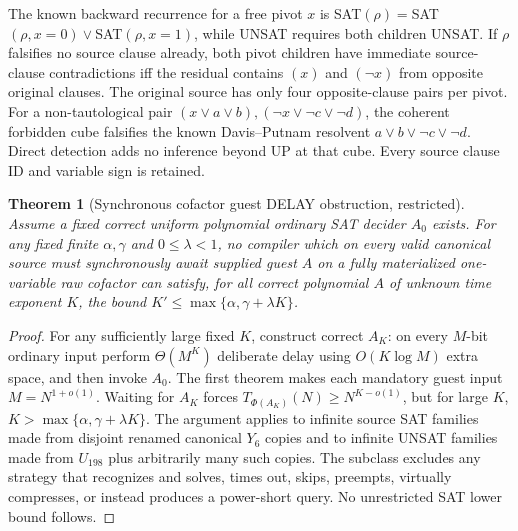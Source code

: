 \documentclass[10pt]{article}
\newtheorem{theorem}{Theorem}
\begin{document}
The known backward recurrence for a free pivot $x$ is SAT$(\rho)=$SAT$(\rho,x=0)\vee$SAT$(\rho,x=1)$, while UNSAT requires both children UNSAT. If $\rho$ falsifies no source clause already, both pivot children have immediate source-clause contradictions iff the residual contains $(x)$ and $(\neg x)$ from opposite original clauses. The original source has only four opposite-clause pairs per pivot. For a non-tautological pair $(x\vee a\vee b),(\neg x\vee\neg c\vee\neg d)$, the coherent forbidden cube falsifies the known Davis--Putnam resolvent $a\vee b\vee\neg c\vee\neg d$. Direct detection adds no inference beyond UP at that cube. Every source clause ID and variable sign is retained.
\begin{theorem}[Synchronous cofactor guest DELAY obstruction, restricted]
Assume a fixed correct uniform polynomial ordinary SAT decider $A_0$ exists. For any fixed finite $\alpha,\gamma$ and $0\le\lambda<1$, no compiler which on every valid canonical source must synchronously await supplied guest $A$ on a fully materialized one-variable raw cofactor can satisfy, for all correct polynomial $A$ of unknown time exponent $K$, the bound $K'\le\max\{\alpha,\gamma+\lambda K\}$.
\end{theorem}
\begin{proof}
For any sufficiently large fixed $K$, construct correct $A_K$: on every $M$-bit ordinary input perform $\Theta(M^K)$ deliberate delay using $O(K\log M)$ extra space, and then invoke $A_0$. The first theorem makes each mandatory guest input $M=N^{1+o(1)}$. Waiting for $A_K$ forces $T_{\Phi(A_K)}(N)\ge N^{K-o(1)}$, but for large $K$, $K>\max\{\alpha,\gamma+\lambda K\}$. The argument applies to infinite source SAT families made from disjoint renamed canonical $Y_6$ copies and to infinite UNSAT families made from $U_{198}$ plus arbitrarily many such copies. The subclass excludes any strategy that recognizes and solves, times out, skips, preempts, virtually compresses, or instead produces a power-short query. No unrestricted SAT lower bound follows.
\end{proof}
\end{document}
